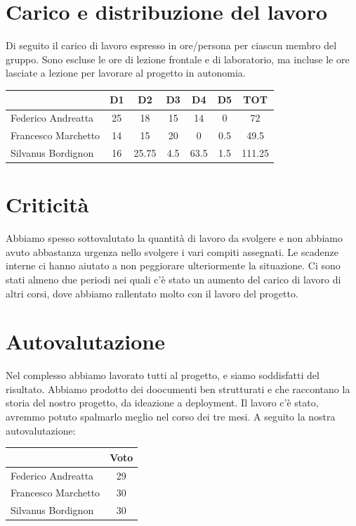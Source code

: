 \documentclass[a4paper,12pt]{article}
\begin{document}
\section{Carico e distribuzione del lavoro}

Di seguito il carico di lavoro espresso in ore/persona per ciascun membro del gruppo. Sono escluse le ore di lezione frontale e di laboratorio, ma incluse le ore lasciate a lezione per lavorare al progetto in autonomia.

\begin{tabular}{|l|c|c|c|c|c|c|}
    \hline
    & \textbf{D1} & \textbf{D2} & \textbf{D3} & \textbf{D4} & \textbf{D5} & \textbf{TOT} \\ \hline
    Federico Andreatta & 25 & 18 & 15 & 14 & 0 & 72 \\ \hline
    Francesco Marchetto & 14 & 15 & 20 & 0 & 0.5 & 49.5 \\ \hline
    Silvanus Bordignon & 16 & 25.75 & 4.5 & 63.5 & 1.5 & 111.25 \\ \hline
\end{tabular}

\section{Criticità}

Abbiamo spesso sottovalutato la quantità di lavoro da svolgere e non abbiamo avuto abbastanza urgenza nello svolgere i vari compiti assegnati. Le scadenze interne ci hanno aiutato a non peggiorare ulteriormente la situazione. Ci sono stati almeno due periodi nei quali c'è stato un aumento del carico di lavoro di altri corsi, dove abbiamo rallentato molto con il lavoro del progetto.

\section{Autovalutazione}

Nel complesso abbiamo lavorato tutti al progetto, e siamo soddisfatti del risultato. Abbiamo prodotto dei doocumenti ben strutturati e che raccontano la storia del nostro progetto, da ideazione a deployment. Il lavoro c'è stato, avremmo potuto spalmarlo meglio nel corso dei tre mesi. A seguito la nostra autovalutazione:

\begin{tabular}{|l|c|}
    \hline
    & Voto \\ \hline
    Federico Andreatta & 29 \\ \hline
    Francesco Marchetto & 30 \\ \hline
    Silvanus Bordignon & 30 \\ \hline
\end{tabular}
\end{document}
